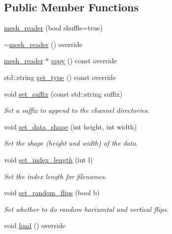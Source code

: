 \subsection*{Public Member Functions}
\begin{DoxyCompactItemize}
\item 
\hyperlink{classlbann_1_1mesh__reader_aa101fb0ec314baedda7b9453de1933b6}{mesh\+\_\+reader} (bool shuffle=true)
\item 
\hyperlink{classlbann_1_1mesh__reader_a1bff81fbd0997e604e7a86ac53112f0f}{$\sim$mesh\+\_\+reader} () override
\item 
\hyperlink{classlbann_1_1mesh__reader}{mesh\+\_\+reader} $\ast$ \hyperlink{classlbann_1_1mesh__reader_ae89964739df2b688f56081292e6e24e1}{copy} () const override
\item 
std\+::string \hyperlink{classlbann_1_1mesh__reader_a77e340cbb58b30b318eecb6a49ca38b6}{get\+\_\+type} () const override
\item 
void \hyperlink{classlbann_1_1mesh__reader_ad8bbf0bcbbf9167328e290e7a56918a5}{set\+\_\+suffix} (const std\+::string suffix)
\begin{DoxyCompactList}\small\item\em Set a suffix to append to the channel directories. \end{DoxyCompactList}\item 
void \hyperlink{classlbann_1_1mesh__reader_a812e878aa1aafdfe833b70251860b3a2}{set\+\_\+data\+\_\+shape} (int height, int width)
\begin{DoxyCompactList}\small\item\em Set the shape (height and width) of the data. \end{DoxyCompactList}\item 
void \hyperlink{classlbann_1_1mesh__reader_a06970dacd445a325059033d47b24694e}{set\+\_\+index\+\_\+length} (int l)
\begin{DoxyCompactList}\small\item\em Set the index length for filenames. \end{DoxyCompactList}\item 
void \hyperlink{classlbann_1_1mesh__reader_a48eedb0d62f445c8ba6d07d2f22da722}{set\+\_\+random\+\_\+flips} (bool b)
\begin{DoxyCompactList}\small\item\em Set whether to do random horizontal and vertical flips. \end{DoxyCompactList}\item 
void \hyperlink{classlbann_1_1mesh__reader_a445c5a63f82da4d94905a205783dc377}{load} () override

\end{DoxyCompactItemize}
